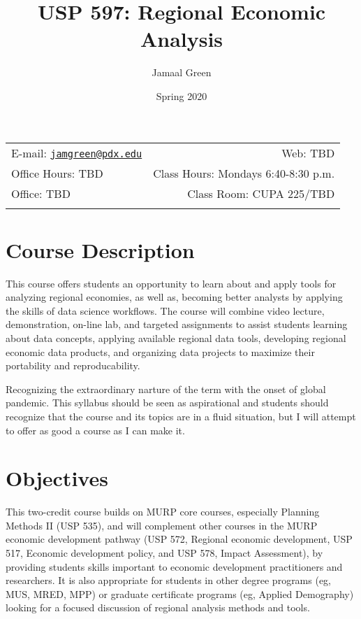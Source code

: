 \documentclass[11pt,]{article}
\title{USP 597: Regional Economic Analysis}
\author{Jamaal Green}
\date{Spring 2020}
\begin{document}
  

		\maketitle
		
	
		\thispagestyle{firststyle}



	\noindent \begin{tabular*}{\textwidth}{ @{\extracolsep{\fill}} lr @{\extracolsep{\fill}}}


E-mail: \texttt{\href{mailto:jamgreen@pdx.edu}{\nolinkurl{jamgreen@pdx.edu}}} & Web: TBD\\
Office Hours: TBD  &  Class Hours: Mondays 6:40-8:30 p.m.\\
Office: TBD  & Class Room: CUPA 225/TBD\\
	&  \\
	\hline
	\end{tabular*}
	
\vspace{2mm}
	


\hypertarget{course-description}{%
\section{Course Description}\label{course-description}}

This course offers students an opportunity to learn about and apply
tools for analyzing regional economies, as well as, becoming better
analysts by applying the skills of data science workflows. The course
will combine video lecture, demonstration, on-line lab, and targeted
assignments to assist students learning about data concepts, applying
available regional data tools, developing regional economic data
products, and organizing data projects to maximize their portability and
reproducability.

Recognizing the extraordinary narture of the term with the onset of
global pandemic. This syllabus should be seen as aspirational and
students should recognize that the course and its topics are in a fluid
situation, but I will attempt to offer as good a course as I can make
it.

\hypertarget{objectives}{%
\section{Objectives}\label{objectives}}

This two-credit course builds on MURP core courses, especially Planning
Methods II (USP 535), and will complement other courses in the MURP
economic development pathway (USP 572, Regional economic development,
USP 517, Economic development policy, and USP 578, Impact Assessment),
by providing students skills important to economic development
practitioners and researchers. It is also appropriate for students in
other degree programs (eg, MUS, MRED, MPP) or graduate certificate
programs (eg, Applied Demography) looking for a focused discussion of
regional analysis methods and tools.
\end{document}
